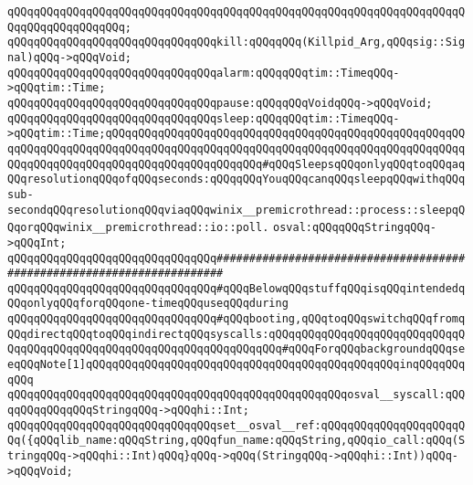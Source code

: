\verb|qQQqqQQqqQQqqQQqqQQqqQQqqQQqqQQqqQQqqQQqqQQqqQQqqQQqqQQqqQQqqQQqqQQqqQQqqQQqqQQqqQQqqQQq;|\newline
\newline
\verb|qQQqqQQqqQQqqQQqqQQqqQQqqQQqqQQqkill:qQQqqQQq(Killpid_Arg,qQQqsig::Signal)qQQq->qQQqVoid;|\newline
\newline
\verb|qQQqqQQqqQQqqQQqqQQqqQQqqQQqqQQqalarm:qQQqqQQqtim::TimeqQQq->qQQqtim::Time;|\newline
\verb|qQQqqQQqqQQqqQQqqQQqqQQqqQQqqQQqpause:qQQqqQQqVoidqQQq->qQQqVoid;|\newline
\verb|qQQqqQQqqQQqqQQqqQQqqQQqqQQqqQQqsleep:qQQqqQQqtim::TimeqQQq->qQQqtim::Time;qQQqqQQqqQQqqQQqqQQqqQQqqQQqqQQqqQQqqQQqqQQqqQQqqQQqqQQqqQQqqQQqqQQqqQQqqQQqqQQqqQQqqQQqqQQqqQQqqQQqqQQqqQQqqQQqqQQqqQQqqQQqqQQqqQQqqQQqqQQqqQQqqQQqqQQqqQQqqQQqqQQq#qQQqSleepsqQQqonlyqQQqtoqQQqaqQQqresolutionqQQqofqQQqseconds:qQQqqQQqYouqQQqcanqQQqsleepqQQqwithqQQqsub-secondqQQqresolutionqQQqviaqQQqwinix__premicrothread::process::sleepqQQqorqQQqwinix__premicrothread::io::poll.|\newline
\newline
\verb|osval:qQQqqQQqStringqQQq->qQQqInt;|\newline
\newline
\newline
\verb|qQQqqQQqqQQqqQQqqQQqqQQqqQQqqQQq#######################################################################|\newline
\verb|qQQqqQQqqQQqqQQqqQQqqQQqqQQqqQQq#qQQqBelowqQQqstuffqQQqisqQQqintendedqQQqonlyqQQqforqQQqone-timeqQQquseqQQqduring|\newline
\verb|qQQqqQQqqQQqqQQqqQQqqQQqqQQqqQQq#qQQqbooting,qQQqtoqQQqswitchqQQqfromqQQqdirectqQQqtoqQQqindirectqQQqsyscalls:qQQqqQQqqQQqqQQqqQQqqQQqqQQqqQQqqQQqqQQqqQQqqQQqqQQqqQQqqQQqqQQqqQQqqQQq#qQQqForqQQqbackgroundqQQqseeqQQqNote[1]qQQqqQQqqQQqqQQqqQQqqQQqqQQqqQQqqQQqqQQqqQQqqQQqinqQQqqQQqqQQq|\newline
\newline
\newline
\verb|qQQqqQQqqQQqqQQqqQQqqQQqqQQqqQQqqQQqqQQqqQQqqQQqqQQqosval__syscall:qQQqqQQqqQQqqQQqStringqQQq->qQQqhi::Int;|\newline
\verb|qQQqqQQqqQQqqQQqqQQqqQQqqQQqqQQqset__osval__ref:qQQqqQQqqQQqqQQqqQQqqQQq({qQQqlib_name:qQQqString,qQQqfun_name:qQQqString,qQQqio_call:qQQq(StringqQQq->qQQqhi::Int)qQQq}qQQq->qQQq(StringqQQq->qQQqhi::Int))qQQq->qQQqVoid;|\newline
